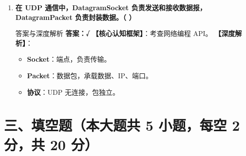 \documentclass[12pt, a4paper]{ctexart}
\begin{document}
\begin{enumerate}[label=\arabic*.]
	\item \textbf{在 UDP 通信中，DatagramSocket 负责发送和接收数据报，DatagramPacket 负责封装数据。（ \quad ）}
	      \begin{bluebox}{答案与深度解析}
		      \textbf{答案：√}
		      \textbf{【核心认知框架】}：考查网络编程 API。
		      \textbf{【深度解析】}：
		      \begin{itemize}[leftmargin=*, nosep]
			      \item \textbf{Socket}：端点，负责传输。
			      \item \textbf{Packet}：数据包，承载数据、IP、端口。
			      \item \textbf{协议}：UDP 无连接，包独立。
		      \end{itemize}
	      \end{bluebox}
\end{enumerate}

\section*{三、填空题（本大题共 5 小题，每空 2 分，共 20 分）}
\end{document}
